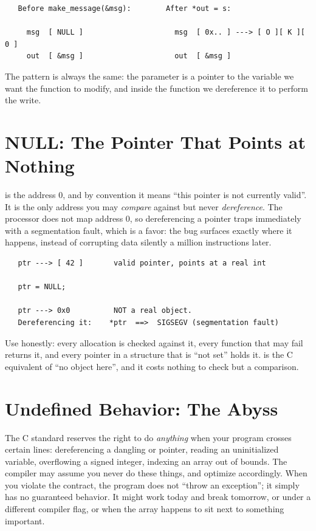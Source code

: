 \begin{verbatim}
   Before make_message(&msg):        After *out = s:

     msg  [ NULL ]                     msg  [ 0x.. ] ---> [ O ][ K ][ 0 ]
     out  [ &msg ]                     out  [ &msg ]
\end{verbatim}

The pattern is always the same: the parameter is a pointer to the
variable we want the function to modify, and inside the function we
dereference it to perform the write.

\section{NULL: The Pointer That Points at Nothing}

 is the address 0, and by convention it means ``this pointer
is not currently valid''. It is the only address you may
\emph{compare} against but never \emph{dereference}. The processor does
not map address 0, so dereferencing a  pointer traps
immediately with a segmentation fault, which is a favor: the bug
surfaces exactly where it happens, instead of corrupting data silently
a million instructions later.

\begin{verbatim}
   ptr ---> [ 42 ]       valid pointer, points at a real int

   ptr = NULL;

   ptr ---> 0x0          NOT a real object.
   Dereferencing it:    *ptr  ==>  SIGSEGV (segmentation fault)
\end{verbatim}

Use  honestly: every allocation is checked against it,
every function that may fail returns it, and every pointer in a
structure that is ``not set'' holds it.  is the C equivalent
of ``no object here'', and it costs nothing to check but a comparison.

\section{Undefined Behavior: The Abyss}

The C standard reserves the right to do \emph{anything} when your
program crosses certain lines: dereferencing a dangling or 
pointer, reading an uninitialized variable, overflowing a signed
integer, indexing an array out of bounds. The compiler may assume you
never do these things, and optimize accordingly. When you violate the
contract, the program does not ``throw an exception''; it simply has no
guaranteed behavior. It might work today and break tomorrow, or under a
different compiler flag, or when the array happens to sit next to
something important.


